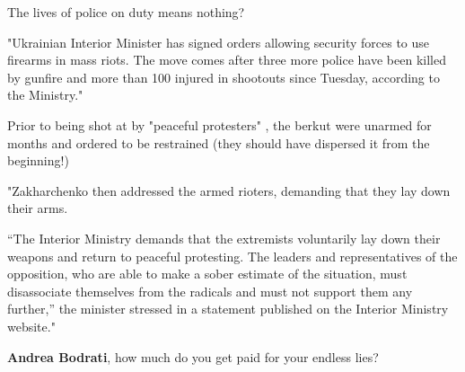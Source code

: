 \begin{itemize}
\begin{itemize}

The lives of police on duty means nothing?

"Ukrainian Interior Minister has signed orders allowing security forces to use
firearms in mass riots. The move comes after three more police have been killed
by gunfire and more than 100 injured in shootouts since Tuesday, according to
the Ministry."


Prior to being shot at by "peaceful protesters" , the berkut were unarmed for
months and ordered to be restrained (they should have dispersed it from the
beginning!)


"Zakharchenko then addressed the armed rioters, demanding that they lay down
their arms.

\enquote{The Interior Ministry demands that the extremists voluntarily lay down their
weapons and return to peaceful protesting. The leaders and representatives of
the opposition, who are able to make a sober estimate of the situation, must
disassociate themselves from the radicals and must not support them any
further,} the minister stressed in a statement published on the Interior
Ministry website."

\textbf{Andrea Bodrati}, how much do you get paid for your endless lies?



\end{itemize}
\end{itemize}
